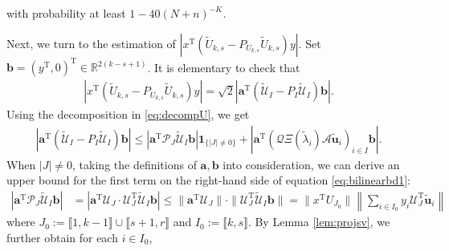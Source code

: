 \documentclass[reqno]{amsart}
\newcommand{\T}{\mathrm{T}}
\theoremstyle{plain}
\theoremstyle{definition}
\begin{document}
with probability at least $1-40(N+n)^{-K}$. %

Next, we turn to the estimation of $\left| x^\T (\widetilde U_{k,s}-P_{U_{k,s}}\widetilde U_{k,s}) y \right|$. Set $\mathbf b=(y^\T, 0)^\T \in \mathbb R^{2(k-s+1)}$. It is elementary to check that 
\begin{align*}
\left| x^\T (\widetilde U_{k,s}-P_{U_{k,s}}\widetilde U_{k,s}) y \right| =\sqrt{2} \left|\mathbf a^\T (\widetilde{\mathcal U}_I - P_I \widetilde{\mathcal U}_I)\mathbf b \right|.
\end{align*}
Using the decomposition in \eqref{eq:decompU}, we get 
\begin{align}\label{eq:bilinearbd1}
\left|\mathbf a^\T (\widetilde{\mathcal U}_I - P_I \widetilde{\mathcal U}_I)\mathbf b \right| \le \left| \mathbf a^\T \mathcal P_J \widetilde{\mathcal U}_I \mathbf b \right| \mathbf{1}_{\{|J| \neq 0 \}} +  \left| \mathbf a^\T (\mathcal Q \Xi(\widetilde \lambda_i) \mathcal A \widetilde{\mathbf u}_i)_{i\in I} \mathbf b \right|.
\end{align}
When $|J| \neq 0$, taking the definitions of $\mathbf a, \mathbf b$ into consideration, we can derive an upper bound for the first term on the right-hand side of equation \eqref{eq:bilinearbd1}:
\begin{align*}
 \left| \mathbf a^\T \mathcal P_J \widetilde{\mathcal U}_I \mathbf b \right| &= \left| \mathbf a^\T \mathcal U_J \cdot \mathcal U_J^\T \widetilde{\mathcal U}_I \mathbf b \right|\le \|\mathbf a^\T \mathcal U_J\| \cdot \| \mathcal U_J^\T \widetilde{\mathcal U}_I \mathbf b\|= \| x^\T U_{J_0}\| \left\| \sum_{i\in I_0} y_i \mathcal U_J^\T \widetilde{\mathbf u}_i \right\|
\end{align*}
where $J_0:=\llbracket 1, k-1\rrbracket \cup \llbracket s+1, r\rrbracket$ and $I_0:=\llbracket k, s\rrbracket$. By Lemma \ref{lem:projsv}, we further obtain for each $i\in I_0$,
\end{document}
